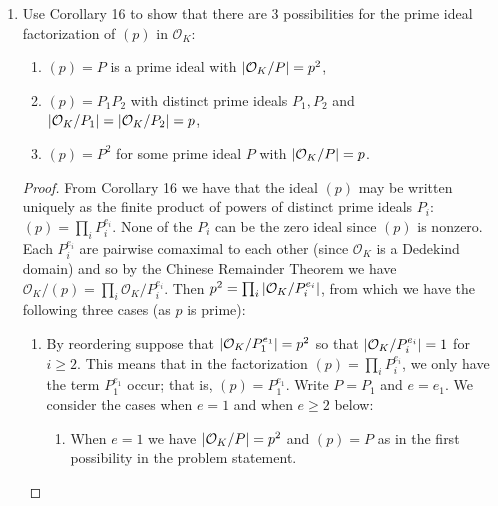 \documentclass[11pt]{article}
\begin{document}
\begin{enumerate}
\begin{enumerate}
\begin{proof}
            In the case that $\omega = (1+\sqrt{D})/2$, $p$ must divide $b/2$ and hence also $b$ (as $p$ is either $2$ or coprime with $2$), and $p$ must divide $a+b/2$ and hence also $a+b/2-b/2=a$. Thus nonzero elements in the quotient $\mathcal{O}_K/(p)$ are of the form $x+y\omega$ for $x,y\in \{0,\dots,p-1\}$.

            It follows that $\abs{\mathcal{O}_K/(p)}= p^2$.
        \end{proof}
        \item Use Corollary 16 to show that there are 3 possibilities for the prime ideal factorization of $(p)$ in $\mathcal{O}_K$: \begin{enumerate}
            \item $(p) = P$ is a prime ideal with $\abs{\mathcal{O}_K/P}=p^2$,
            \item $(p)=P_1P_2$ with distinct prime ideals $P_1,P_2$ and $\abs{\mathcal{O}_K/P_1}=\abs{\mathcal{O}_K/P_2}=p$,
            \item $(p) = P^2$ for some prime ideal $P$ with $\abs{\mathcal{O}_K/P}=p$.
        \end{enumerate} \begin{proof}
            From Corollary 16 we have that the ideal $(p)$ may be written uniquely as the finite product of powers of distinct prime ideals $P_i$: $(p) = \prod_i P_i^{e_i}$. None of the $P_i$ can be the zero ideal since $(p)$ is nonzero. Each $P_i^{e_i}$ are pairwise comaximal to each other (since $\mathcal{O}_K$ is a Dedekind domain) and so by the Chinese Remainder Theorem we have $\mathcal{O}_K/(p) = \prod_i \mathcal{O}_K/P_i^{e_i}$. Then $p^2 = \prod_i \abs{\mathcal{O}_K/P_i^{e_i}}$, from which we have the following three cases (as $p$ is prime): \begin{enumerate}
                \item By reordering suppose that $\abs{\mathcal{O}_K/P_1^{e_1}}=p^2$ so that $\abs{\mathcal{O}_K/P_i^{e_i}}=1$ for $i\geq 2$. This means that in the factorization $(p) = \prod_i P_i^{e_i}$, we only have the term $P_1^{e_1}$ occur; that is, $(p)= P_1^{e_1}$. Write $P = P_1$ and $e = e_1$. We consider the cases when $e = 1$ and when $e\geq 2$ below: \begin{enumerate}
                    \item When $e = 1$ we have $\abs{\mathcal{O}_K/P}=p^2$ and $(p) =P$ as in the first possibility in the problem statement.

\end{enumerate}
\end{enumerate}
\end{proof}
\end{enumerate}
\end{enumerate}
\end{document}
